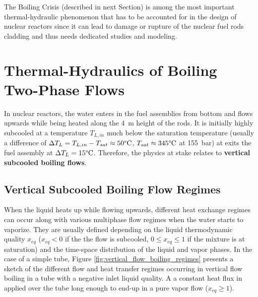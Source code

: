 \npar

The Boiling Crisis (described in next Section) is among the most important thermal-hydraulic phenomenon that has to be accounted for in the design of nuclear reactors since it can lead to damage or rupture of the nuclear fuel rods cladding and thus needs dedicated studies and modeling. %


\section{Thermal-Hydraulics of Boiling Two-Phase Flows}

In nuclear reactors, the water enters in the fuel assemblies from bottom and flows upwards while being heated along the 4~m height of the rods. It is initially highly subcooled \ie at a temperature $T_{L,in}$ much below the saturation temperature (usually a difference of $\Delta T_{L} = T_{L,in}-T_{sat} \approx 50 \degree\mathrm{C}$, $T_{sat} \approx 345\degree\mathrm{C}$ at 155\ bar) at exits the fuel assembly at $\Delta T_{L} = 15\degree\mathrm{C}$. Therefore, the physics at stake relates to \textbf{vertical subcooled boiling flows}.


\subsection{Vertical Subcooled Boiling Flow Regimes}

When the liquid heats up while flowing upwards, different heat exchange regimes can occur along with various multiphase flow regimes when the water starts to vaporize. They are usually defined depending on the liquid thermodynamic quality $x_{eq}$ ($x_{eq}<0$ if the the flow is subcooled, $0 \leq x_{eq} \leq 1$ if the mixture is at saturation) and the time-space distribution of the liquid and vapor phases. In the case of a simple tube, Figure \ref{fig:vertical_flow_boiling_regimes} presents a sketch of the different flow and heat transfer regimes occurring in vertical flow boiling in a tube with a negative inlet liquid quality. A a constant heat flux in applied over the tube long enough to end-up in a pure vapor flow ($x_{eq} \geq 1$).


